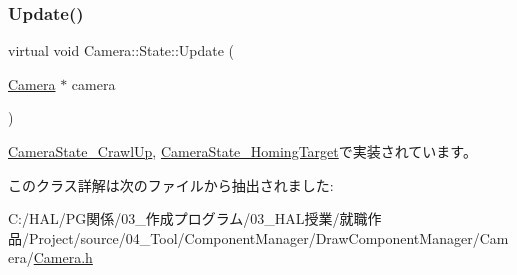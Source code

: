 \mbox{\label{class_camera_1_1_state_a2d41e0cb783666bae6c6ea167fcc7874}} 
\subsubsection{\texorpdfstring{Update()}{Update()}}
{\footnotesize\ttfamily virtual void Camera\+::\+State\+::\+Update (\begin{DoxyParamCaption}\item[{\mbox{\hyperlink{class_camera}{Camera}} $\ast$}]{camera }\end{DoxyParamCaption})\hspace{0.3cm}{\ttfamily [pure virtual]}}



\mbox{\hyperlink{class_camera_state___crawl_up_aaebd2634f1677b7c00e6761ed91e1264}{Camera\+State\+\_\+\+Crawl\+Up}}, \mbox{\hyperlink{class_camera_state___homing_target_a98f04985c06033febdad32d6357088c9}{Camera\+State\+\_\+\+Homing\+Target}}で実装されています。



このクラス詳解は次のファイルから抽出されました\+:\begin{DoxyCompactItemize}
\item 
C\+:/\+H\+A\+L/\+P\+G関係/03\+\_\+作成プログラム/03\+\_\+\+H\+A\+L授業/就職作品/\+Project/source/04\+\_\+\+Tool/\+Component\+Manager/\+Draw\+Component\+Manager/\+Camera/\mbox{\hyperlink{_camera_8h}{Camera.\+h}}\end{DoxyCompactItemize}
